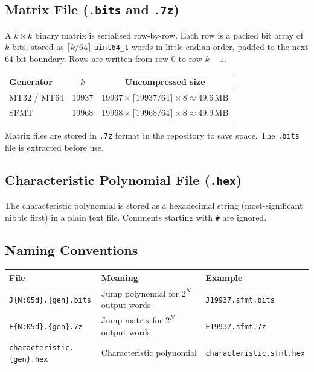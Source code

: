 \documentclass{article}
\begin{document}
\subsection{Matrix File (\texttt{.bits} and \texttt{.7z})}

A $k \times k$ binary matrix is serialised row-by-row.  Each row is a packed bit array of
$k$ bits, stored as $\lceil k / 64 \rceil$ \texttt{uint64\_t} words in little-endian order,
padded to the next 64-bit boundary.  Rows are written from row 0 to row $k-1$.

\begin{center}
\begin{tabular}{lcc}
\toprule
Generator & $k$ & Uncompressed size \\
\midrule
MT32 / MT64 & 19937 & $19937 \times \lceil 19937/64\rceil \times 8 \approx 49.6\,\text{MB}$ \\
SFMT        & 19968 & $19968 \times \lceil 19968/64\rceil \times 8 \approx 49.9\,\text{MB}$ \\
\bottomrule
\end{tabular}
\end{center}

Matrix files are stored in \texttt{.7z} format in the repository to save space.  The
\texttt{.bits} file is extracted before use.

\subsection{Characteristic Polynomial File (\texttt{.hex})}

The characteristic polynomial is stored as a hexadecimal string (most-significant nibble
first) in a plain text file.  Comments starting with \texttt{\#} are ignored.

\subsection{Naming Conventions}

\begin{center}
\begin{tabular}{lll}
\toprule
File & Meaning & Example \\
\midrule
\texttt{J\{N:05d\}.\{gen\}.bits} & Jump polynomial for $2^N$ output words & \texttt{J19937.sfmt.bits} \\
\texttt{F\{N:05d\}.\{gen\}.7z}   & Jump matrix for $2^N$ output words     & \texttt{F19937.sfmt.7z}  \\
\texttt{characteristic.\{gen\}.hex} & Characteristic polynomial            & \texttt{characteristic.sfmt.hex} \\
\bottomrule
\end{tabular}
\end{center}
\end{document}
